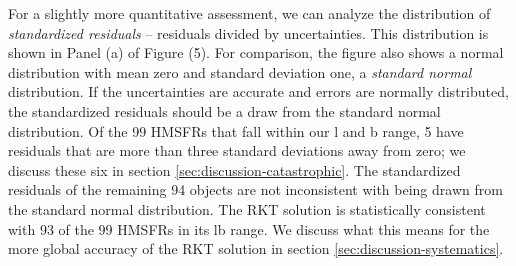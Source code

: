 For a slightly more quantitative assessment, we can analyze the distribution of \emph{standardized residuals} -- residuals divided by uncertainties. This distribution is shown in Panel (a) of Figure (5). For comparison, the figure also shows a normal distribution with mean zero and standard deviation one, a \emph{standard normal} distribution. If the uncertainties are accurate and errors are normally distributed, the standardized residuals should be a draw from the standard normal distribution. Of the 99 HMSFRs that fall within our l and b range, 5 have residuals that are more than three standard deviations away from zero; we discuss these six in section \ref{sec:discussion-catastrophic}. The standardized residuals of the remaining 94 objects are not inconsistent with being drawn from the standard normal distribution. The RKT solution is statistically consistent with 93 of the 99 HMSFRs in its lb range. We discuss what this means for the more global accuracy of the RKT solution in section \ref{sec:discussion-systematics}. 